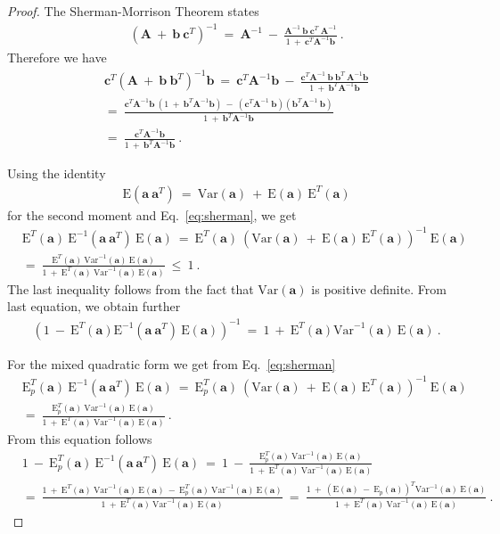 \documentclass{article}
\newcommand\Ba{\bm{a}}
\newcommand\Bb{\bm{b}}
\newcommand\Bc{\bm{c}}
\newcommand\BA{\bm{A}}
\newcommand\EXP{\mathbf{\mathrm{E}}}
\newcommand\VAR{\mathbf{\mathrm{Var}}}
\begin{document}
\begin{proof}
The Sherman-Morrison Theorem states
\begin{align}
&\left(\BA \ + \ \Bb \ \Bc^T \right)^{-1} \ = \ \BA^{-1} \ - \ \frac{\BA^{-1}
    \ \Bb \ \Bc^T \ \BA^{-1}}{1 \ + \ \Bc^T \BA^{-1} \Bb} \ .
\end{align}
Therefore we have
\begin{align}
\label{eq:sherman}
&\Bc^T \left(\BA \ + \ \Bb \ \Bb^T\right)^{-1} \Bb \ = \ \Bc^T \BA^{-1} \Bb \ - \ \frac{\Bc^T \BA^{-1}
    \ \Bb \ \Bb^T \ \BA^{-1} \Bb}{1 \ + \ \Bb^T \BA^{-1} \Bb} \\ \nonumber
&= \ \frac{\Bc^T \BA^{-1} \Bb \ \left( 1 \ + \ \Bb^T \BA^{-1} \Bb
  \right) \ - \ \left(\Bc^T \BA^{-1}
    \ \Bb\right)\left(\Bb^T \BA^{-1}
    \ \Bb\right)  }{1 \ + \ \Bb^T \BA^{-1} \Bb} \\ \nonumber
&= \ \frac{\Bc^T \BA^{-1} \Bb}{1 \ + \ \Bb^T \BA^{-1} \Bb} \ .
\end{align}

Using the identity
\begin{align}
&\EXP(\Ba \ \Ba^T) \ = \ \VAR(\Ba) \ + \ \EXP(\Ba) \ \EXP^T(\Ba)
\end{align}
for the second moment and Eq.~\eqref{eq:sherman}, we get
\begin{align}
&\EXP^T(\Ba) \ \EXP^{-1}(\Ba \ \Ba^T) \ \EXP(\Ba)
\ = \ \EXP^T(\Ba) \ \left( \VAR(\Ba) \ + \ \EXP(\Ba) \ \EXP^T(\Ba)
\right)^{-1} \ \EXP(\Ba) \\ \nonumber
&= \ \frac{\EXP^T(\Ba) \ \VAR^{-1}(\Ba) \ \EXP(\Ba)}{1 \ + \
  \EXP^T(\Ba) \ \VAR^{-1}(\Ba) \ \EXP(\Ba)}
\ \leq \ 1 \ .
\end{align}
The last inequality follows from the fact that $\VAR(\Ba)$ is positive definite.
From last equation, we obtain further
\begin{align}
&\left( 1 \ - \ \EXP^T(\Ba) \EXP^{-1}(\Ba \ \Ba^T) \ \EXP(\Ba)
\right)^{-1} \ = \ 1 \ + \ \EXP^T(\Ba) \VAR^{-1}(\Ba) \ \EXP(\Ba) \ .
\end{align}

For the mixed quadratic form we get from Eq.~\eqref{eq:sherman}
\begin{align}
&\EXP_p^T(\Ba) \ \EXP^{-1}(\Ba \ \Ba^T) \ \EXP(\Ba)
\ = \ \EXP_p^T(\Ba) \ \left( \VAR(\Ba) \ + \ \EXP(\Ba) \ \EXP^T(\Ba)
\right)^{-1} \ \EXP(\Ba) \\ \nonumber
&= \ \frac{\EXP_p^T(\Ba) \ \VAR^{-1}(\Ba) \ \EXP(\Ba)}{1 \ + \
  \EXP^T(\Ba) \ \VAR^{-1}(\Ba) \ \EXP(\Ba)}
\ .
\end{align}
From this equation follows
\begin{align}
&1 \ - \ \EXP_p^T(\Ba) \ \EXP^{-1}(\Ba \ \Ba^T) \ \EXP(\Ba)
\ = \ 1 \ - \ \frac{\EXP_p^T(\Ba) \ \VAR^{-1}(\Ba) \ \EXP(\Ba)}{1 \ + \
  \EXP^T(\Ba) \ \VAR^{-1}(\Ba) \ \EXP(\Ba)}
 \\ \nonumber
&= \ \frac{1 \ + \  \EXP^T(\Ba) \ \VAR^{-1}(\Ba) \ \EXP(\Ba) \ - \
  \EXP_p^T(\Ba) \ \VAR^{-1}(\Ba) \ \EXP(\Ba)}{1 \ + \ \EXP^T(\Ba) \ \VAR^{-1}(\Ba) \ \EXP(\Ba)}
\ = \ \frac{1 \ + \  \left( \EXP(\Ba) \ - \ \EXP_p(\Ba) \right)^T
  \VAR^{-1}(\Ba) \ \EXP(\Ba) }{1 \ + \ \EXP^T(\Ba) \ \VAR^{-1}(\Ba) \ \EXP(\Ba)}
\ .
\end{align}


\end{proof}
\end{document}
